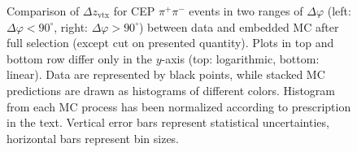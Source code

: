 \begin{figure}[h!]
{\begin{subfigure}[b]{\linewidth}
  \end{subfigure} 
}\caption[Comparison of $\Delta z_{\text{vtx}}$ for CEP $\pi^{+}\pi^{-}$ events in two ranges of $\Delta\varphi$ between data and embedded MC.]{Comparison of $\Delta z_{\text{vtx}}$ for CEP $\pi^{+}\pi^{-}$ events in two ranges of $\Delta\varphi$ (left: $\Delta\varphi<90^{\circ}$, right: $\Delta\varphi>90^{\circ}$) between data and embedded MC after full selection (except cut on presented quantity). Plots in top and bottom row differ only in the $y$-axis (top: logarithmic, bottom: linear). Data are represented by black points, while stacked MC predictions are drawn as histograms of different colors. Histogram from each MC process has been normalized according to prescription in the text. Vertical error bars represent statistical uncertainties, horizontal bars represent bin sizes.}\label{fig:Ratio_DeltaZVtx_DeltaPhiBins}%
\end{figure}


